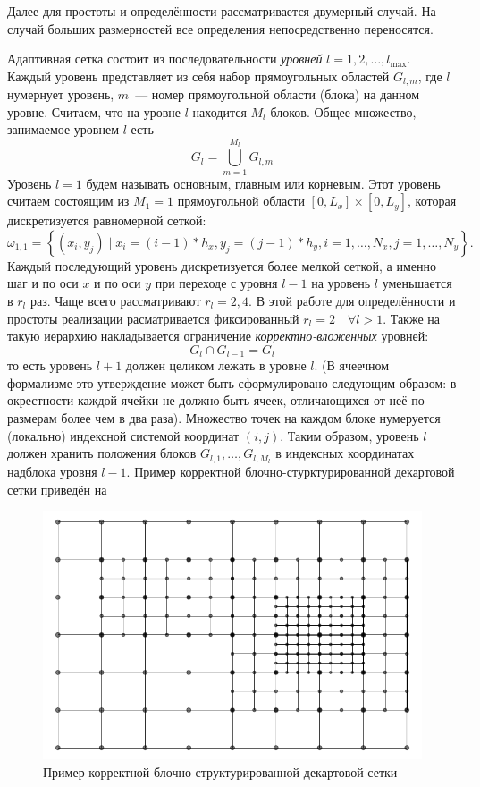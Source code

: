 Далее для простоты и определённости рассматривается двумерный случай.
На случай больших размерностей все определения непосредственно переносятся.

Адаптивная сетка состоит из последовательности \emph{уровней} $l = 1, 2, \ldots, l_{\text{max}}$.
Каждый уровень представляет из себя набор прямоугольных областей $G_{l, m}$, где $l$ нумернует уровень, $m$~--- номер прямоугольной области (блока) на данном уровне.
Считаем, что на уровне $l$ находится $M_l$ блоков.
Общее множество, занимаемое уровнем $l$ есть
\begin{equation*}
    G_{l} = \bigcup_{m = 1}^{M_{l}} G_{l, m}
\end{equation*}
Уровень $l = 1$ будем называть основным, главным или корневым.
Этот уровень считаем состоящим из $M_{1} = 1$ прямоугольной области $[0, L_x] \times [0, L_y]$, которая дискретизуется равномерной сеткой:
\begin{equation*}
    \omega_{1, 1} = \left\{ (x_i, y_j) \mid x_i = (i - 1) * h_x, y_j = (j - 1) * h_y, i = 1, \ldots, N_x, j = 1, \ldots, N_y \right\}.
\end{equation*}
Каждый последующий уровень дискретизуется более мелкой сеткой, а именно шаг и по оси $x$ и по оси $y$ при переходе с уровня $l - 1$ на уровень $l$ уменьшается в $r_{l}$ раз.
Чаще всего рассматривают $r_{l} = 2, 4$.
В этой работе для определённости и простоты реализации расматривается фиксированный $r_l = 2 \quad \forall l > 1$.
Также на такую иерархию накладывается ограничение \emph{корректно-вложенных} уровней:
\begin{equation*}
    G_{l} \cap G_{l - 1} = G_{l}
\end{equation*}
то есть уровень $l + 1$ должен целиком лежать в уровне $l$.
(В ячеечном формализме это утверждение может быть сформулировано следующим образом: в окрестности каждой ячейки не должно быть ячеек, отличающихся от неё по размерам более чем в два раза).
Множество точек на каждом блоке нумеруется (локально) индексной системой координат $(i, j)$.
Таким образом, уровень $l$ должен хранить положения блоков $G_{l, 1}, \ldots, G_{l, M_{l}}$ в индексных координатах надблока уровня $l - 1$.
Пример корректной блочно-стурктурированной декартовой сетки приведён на 
\begin{figure}
    \centering
    \includegraphics{Теория_блочных_локально_адаптивных_сеток/Топология_сетки/grid_topology.pdf}
    \caption{Пример корректной блочно-структурированной декартовой сетки}
    \label{fig:example_BSG}
\end{figure}
